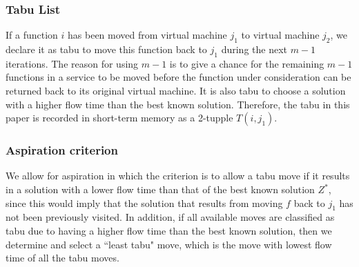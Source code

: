 \documentclass[conference]{IEEEtran}
\begin{document}
\subsubsection{Tabu List} If a function $i$ has been moved from virtual machine $j_1$ to virtual machine $j_2$, we declare it as tabu to move this function back to $j_1$ during the next $m-1$ iterations. The reason for using $m-1$ is to give a chance for the remaining $m-1$ functions in a service to be moved before the function under consideration can be returned back to its original virtual machine. It is also tabu to choose a solution with a higher flow time than the best known solution. Therefore, the tabu in this paper is recorded in short-term memory as a 2-tupple $T(i, j_1)$.
\subsubsection{Aspiration criterion}We allow for aspiration in which the criterion is to allow a tabu move if it results in a solution with a lower flow time than that of the best known solution $Z^*$, since this would imply that the solution that results from moving $f$ back to $j_1$ has not been previously visited. In addition, if all available moves are classified as tabu due to having a higher flow time than the best known solution, then we determine and select a ``least tabu" move, which is the move with lowest flow time of all the tabu moves.
\end{document}
